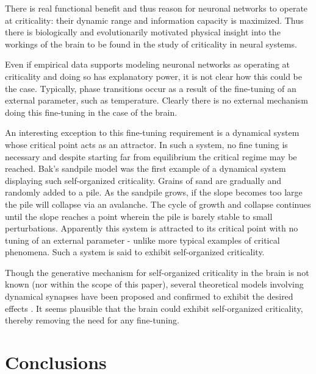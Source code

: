 \documentclass[12pt]{article}
\begin{document}
There is real functional benefit and thus reason for neuronal networks to operate at criticality: their dynamic range and information capacity is maximized. Thus there is biologically and evolutionarily motivated physical insight into the workings of the brain to be found in the study of criticality in neural systems.

Even if empirical data supports modeling neuronal networks as operating at criticality and doing so has explanatory power, it is not clear how this could be the case. Typically, phase transitions occur as a result of the fine-tuning of an external parameter, such as temperature. Clearly there is no external mechanism doing this fine-tuning in the case of the brain. 

An interesting exception to this fine-tuning requirement is a dynamical system whose critical point acts as an attractor. In such a system, no fine tuning is necessary and despite starting far from equilibrium the critical regime may be reached. Bak's sandpile model\cite{Bak1987a} was the first example of a dynamical system displaying such self-organized criticality. Grains of sand are gradually and randomly added to a pile. As the sandpile grows, if the slope becomes too large the pile will collapse via an avalanche. The cycle of growth and collapse continues until the slope reaches a point wherein the pile is barely stable to small perturbations. Apparently this system is attracted to its critical point with no tuning of an external parameter - unlike more typical examples of critical phenomena. Such a system is said to exhibit self-organized criticality.
   
Though the generative mechanism for self-organized criticality in the brain is not known (nor within the scope of this paper), several theoretical models involving dynamical synapses have been proposed and confirmed to exhibit the desired effects \cite{Levina2007a, Levina2009a, Bornholdt2003a, Rybarsch2014a}. It seems plausible that the brain could exhibit self-organized criticality, thereby removing the need for any fine-tuning.

\section*{Conclusions}
\end{document}
